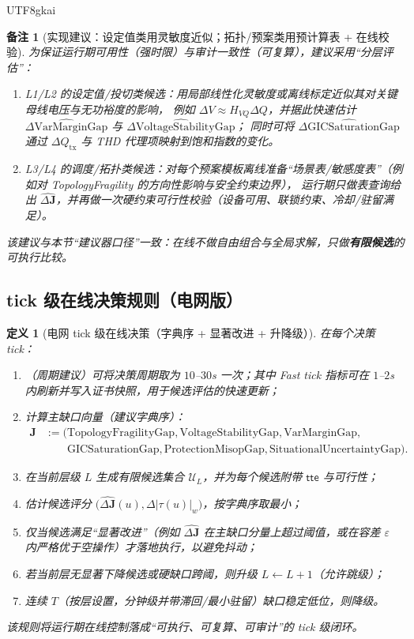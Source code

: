 \documentclass[12pt]{article}
\newtheorem{definition}{定义}[section]
\newtheorem{remark}{备注}[section]
\begin{document}
\begin{CJK*}{UTF8}{gkai}
\begin{remark}[实现建议：设定值类用灵敏度近似；拓扑/预案类用预计算表 + 在线校验]
为保证运行期可用性（强时限）与审计一致性（可复算），建议采用“分层评估”：
\begin{enumerate}
  \item L1/L2 的设定值/投切类候选：用局部线性化灵敏度或离线标定近似其对关键母线电压与无功裕度的影响，
  例如 $\Delta V \approx H_{VQ}\Delta Q$，并据此快速估计 $\widehat{\Delta\mathrm{VarMarginGap}}$ 与
    $\widehat{\Delta\mathrm{VoltageStabilityGap}}$；
  同时可将 $\widehat{\Delta\mathrm{GICSaturationGap}}$ 通过 $\Delta Q_{\mathrm{tx}}$ 与 THD 代理项映射到饱和指数的变化。
  \item L3/L4 的调度/拓扑类候选：对每个预案模板离线准备“场景表/敏感度表”（例如对 TopologyFragility 的方向性影响与安全约束边界），
  运行期只做表查询给出 $\widehat{\Delta\mathbf{J}}$，并再做一次硬约束可行性校验（设备可用、联锁约束、冷却/驻留满足）。
\end{enumerate}
该建议与本节“建议器口径”一致：在线不做自由组合与全局求解，只做\textbf{有限候选}的可执行比较。
\end{remark}

\subsection{tick 级在线决策规则（电网版）}
\label{sec:online-grid-policy}

\begin{definition}[电网 tick 级在线决策（字典序 + 显著改进 + 升降级）]
\label{def:online-grid-policy}
在每个决策 tick：
\begin{enumerate}
  \item （周期建议）可将决策周期取为 $10$--$30$s 一次；其中 Fast tick 指标可在 $1$--$2$s 内刷新并写入证书快照，用于候选评估的快速更新；
  \item 计算主缺口向量（建议字典序）：
  \[
    \begin{aligned}
      \mathbf{J}
      &:=
      \bigl(
        \mathrm{TopologyFragilityGap},\mathrm{VoltageStabilityGap},\mathrm{VarMarginGap},\\
        &\qquad \mathrm{GICSaturationGap},\mathrm{ProtectionMisopGap},\mathrm{SituationalUncertaintyGap}
      \bigr).
    \end{aligned}
  \]
	  \item 在当前层级 $L$ 生成有限候选集合 $\mathcal{U}_L$，并为每个候选附带 $\mathsf{tte}$ 与可行性；
	  \item 估计候选评分 $\bigl(\widehat{\Delta\mathbf{J}}(u),\Delta|\tau(u)|_w\bigr)$，按字典序取最小；
  \item 仅当候选满足“显著改进”（例如 $\widehat{\Delta\mathbf{J}}$ 在主缺口分量上超过阈值，或在容差 $\varepsilon$ 内严格优于空操作）才落地执行，以避免抖动；
  \item 若当前层无显著下降候选或硬缺口跨阈，则升级 $L\leftarrow L+1$（允许跳级）；
  \item 连续 $T$（按层设置，分钟级并带滞回/最小驻留）缺口稳定低位，则降级。
\end{enumerate}
该规则将运行期在线控制落成“可执行、可复算、可审计”的 tick 级闭环。
\end{definition}


\end{CJK*}
\end{document}
